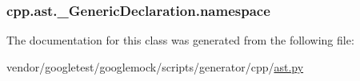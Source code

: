 \subsubsection[{\texorpdfstring{namespace}{namespace}}]{\setlength{\rightskip}{0pt plus 5cm}cpp.\+ast.\+\_\+\+Generic\+Declaration.\+namespace}\hypertarget{classcpp_1_1ast_1_1__GenericDeclaration_a8aee3f11b37449d54b42a78e0a689f46}{}\label{classcpp_1_1ast_1_1__GenericDeclaration_a8aee3f11b37449d54b42a78e0a689f46}


The documentation for this class was generated from the following file\+:\begin{DoxyCompactItemize}
\item 
vendor/googletest/googlemock/scripts/generator/cpp/\hyperlink{ast_8py}{ast.\+py}\end{DoxyCompactItemize}
